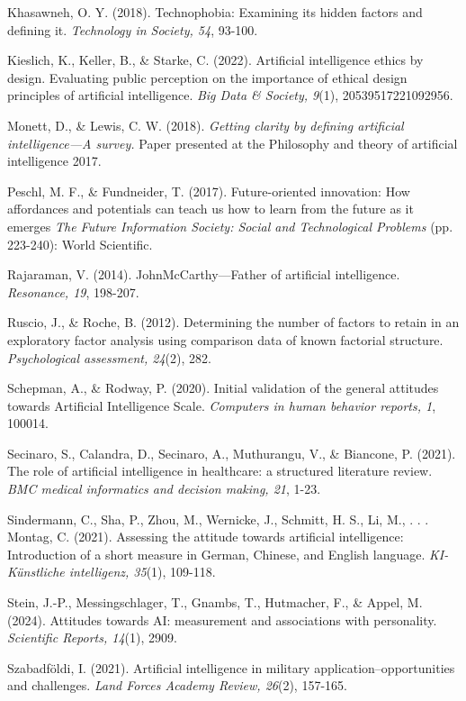 Khasawneh, O. Y. (2018). Technophobia: Examining its hidden factors and defining it. \textit{Technology in Society, 54}, 93-100.

Kieslich, K., Keller, B., \& Starke, C. (2022). Artificial intelligence ethics by design. Evaluating public perception on the importance of ethical design principles of artificial intelligence. \textit{Big Data \& Society, 9}(1), 20539517221092956.

Monett, D., \& Lewis, C. W. (2018). \textit{Getting clarity by defining artificial intelligence—A survey.} Paper presented at the Philosophy and theory of artificial intelligence 2017.

Peschl, M. F., \& Fundneider, T. (2017). Future-oriented innovation: How affordances and potentials can teach us how to learn from the future as it emerges \textit{The Future Information Society: Social and Technological Problems} (pp. 223-240): World Scientific.

Rajaraman, V. (2014). JohnMcCarthy—Father of artificial intelligence. \textit{Resonance, 19}, 198-207.

Ruscio, J., \& Roche, B. (2012). Determining the number of factors to retain in an exploratory factor analysis using comparison data of known factorial structure. \textit{Psychological assessment, 24}(2), 282.

Schepman, A., \& Rodway, P. (2020). Initial validation of the general attitudes towards Artificial Intelligence Scale. \textit{Computers in human behavior reports, 1}, 100014.

Secinaro, S., Calandra, D., Secinaro, A., Muthurangu, V., \& Biancone, P. (2021). The role of artificial intelligence in healthcare: a structured literature review. \textit{BMC medical informatics and decision making, 21}, 1-23.

Sindermann, C., Sha, P., Zhou, M., Wernicke, J., Schmitt, H. S., Li, M., . . . Montag, C. (2021). Assessing the attitude towards artificial intelligence: Introduction of a short measure in German, Chinese, and English language. \textit{KI-Künstliche intelligenz, 35}(1), 109-118.

Stein, J.-P., Messingschlager, T., Gnambs, T., Hutmacher, F., \& Appel, M. (2024). Attitudes towards AI: measurement and associations with personality. \textit{Scientific Reports, 14}(1), 2909.

Szabadföldi, I. (2021). Artificial intelligence in military application–opportunities and challenges. \textit{Land Forces Academy Review, 26}(2), 157-165.

